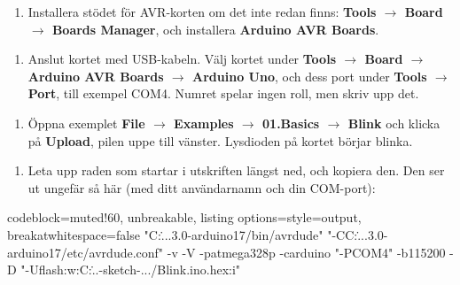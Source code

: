 \begin{enumerate}[start=3]
  \item Installera stödet för AVR-korten om det inte redan finns: \textbf{Tools $\rightarrow$ Board
    $\rightarrow$ Boards Manager}, och installera \textbf{Arduino AVR Boards}.
\end{enumerate}



\begin{enumerate}[start=4]
  \item Anslut kortet med USB-kabeln. Välj kortet under \textbf{Tools $\rightarrow$ Board
    $\rightarrow$ Arduino AVR Boards $\rightarrow$ Arduino Uno}, och dess port under
    \textbf{Tools $\rightarrow$ Port}, till exempel COM4. Numret spelar ingen roll, men skriv upp
    det.
\end{enumerate}



\begin{enumerate}[start=5]
  \item Öppna exemplet \textbf{File $\rightarrow$ Examples $\rightarrow$ 01.Basics $\rightarrow$
    Blink} och klicka på \textbf{Upload}, pilen uppe till vänster. Lysdioden på kortet börjar
    blinka.
\end{enumerate}


\begin{enumerate}[start=6]
  \item Leta upp raden som startar  i utskriften längst ned, och kopiera den. Den ser
    ut ungefär så här (med ditt användarnamn och din COM-port):
\end{enumerate}

\begin{tcblisting}{codeblock=muted!60, unbreakable,
  listing options={style=output, breakatwhitespace=false}}
"C:\Users\...\packages\arduino\tools\avrdude\6.3.0-arduino17/bin/avrdude"
"-CC:\Users\...\packages\arduino\tools\avrdude\6.3.0-arduino17/etc/avrdude.conf"
-v -V -patmega328p -carduino "-PCOM4" -b115200 -D
"-Uflash:w:C:\Users\...\Temp\arduino-sketch-.../Blink.ino.hex:i"
\end{tcblisting}

